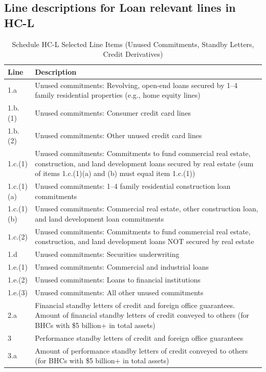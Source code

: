 \documentclass[conference]{IEEEtran}
\begin{document}
\subsection{Line descriptions for Loan relevant lines in HC-L}
\begin{table}[htbp]
	\centering
	\caption{Schedule HC-L Selected Line Items (Unused Commitments, Standby Letters, Credit Derivatives)}
	\begin{tabular}{|p{3cm}|p{12cm}|}
		\hline
		\textbf{Line} & \textbf{Description} \\
		\hline
		1.a & Unused commitments: Revolving, open-end loans secured by 1--4 family residential properties (e.g., home equity lines) \\
		\hline
		1.b.(1) & Unused commitments: Consumer credit card lines \\
		\hline
		1.b.(2) & Unused commitments: Other unused credit card lines \\
		\hline
		1.c.(1) & Unused commitments: Commitments to fund commercial real estate, construction, and land development loans secured by real estate (sum of items 1.c.(1)(a) and (b) must equal item 1.c.(1)) \\
		\hline
		1.c.(1)(a) & Unused commitments: 1--4 family residential construction loan commitments \\
		\hline
		1.c.(1)(b) & Unused commitments: Commercial real estate, other construction loan, and land development loan commitments \\
		\hline
		1.c.(2) & Unused commitments: Commitments to fund commercial real estate, construction, and land development loans NOT secured by real estate \\
		\hline
		1.d & Unused commitments: Securities underwriting \\
		\hline
		1.e.(1) & Unused commitments: Commercial and industrial loans \\
		\hline
		1.e.(2) & Unused commitments: Loans to financial institutions \\
		\hline
		1.e.(3) & Unused commitments: All other unused commitments \\
		\hline
		2.a & Financial standby letters of credit and foreign office guarantees. Amount of financial standby letters of credit conveyed to others (for BHCs with \$5 billion+ in total assets) \\
		\hline
		3 & Performance standby letters of credit and foreign office guarantees \\
		\hline
		3.a & Amount of performance standby letters of credit conveyed to others (for BHCs with \$5 billion+ in total assets) \\

\end{tabular}
\end{table}
\end{document}
